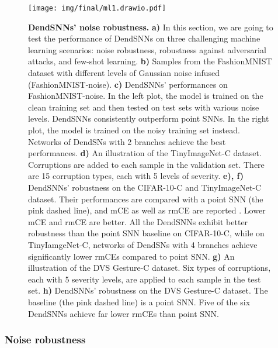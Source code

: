 \begin{figure}[tp!]
    \centering
    \texttt{[image: img/final/ml1.drawio.pdf]}
    \caption{
        \textbf{DendSNNs' noise robustness.}
        \textbf{a)} In this section, we are going to test the performance of DendSNNs on three challenging machine learning scenarios: noise robustness, robustness against adversarial attacks, and few-shot learning.
        \textbf{b)} Samples from the FashionMNIST dataset with different levels of Gaussian noise infused (FashionMNIST-noise).
        \textbf{c)} DendSNNs' performances on FashionMNIST-noise. In the left plot, the model is trained on the clean training set and then tested on test sets with various noise levels. DendSNNs consistently outperform point SNNs. In the right plot, the model is trained on the noisy training set instead. Networks of DendSNs with 2 branches achieve the best performances.
        \textbf{d)} An illustration of the TinyImageNet-C dataset. Corruptions are added to each sample in the validation set. There are 15 corruption types, each with 5 levels of severity.
        \textbf{e), f)} DendSNNs' robustness on the CIFAR-10-C and TinyImageNet-C dataset. Their performances are compared with a point SNN (the pink dashed line), and mCE as well as rmCE are reported \cite{hendrycks2019benchmarking}. Lower mCE and rmCE are better. All the DendSNNs exhibit better robustness than the point SNN baseline on CIFAR-10-C, while on TinyIamgeNet-C, networks of DendSNs with 4 branches achieve significantly lower rmCEs compared to point SNN.
        \textbf{g)} An illustration of the DVS Gesture-C dataset. Six types of corruptions, each with 5 severity levels, are applied to each sample in the test set.
        \textbf{h)} DendSNNs' robustness on the DVS Gesture-C dataset. The baseline (the pink dashed line) is a point SNN. Five of the six DendSNNs achieve far lower rmCEs than point SNN. 
    }
    \label{fig:robustness}
\end{figure}

\subsubsection*{Noise robustness}

